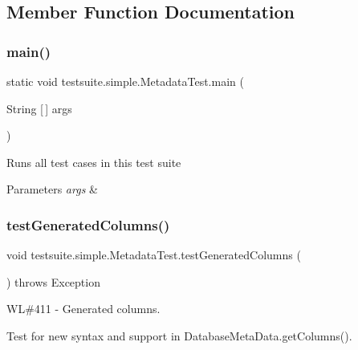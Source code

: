 \subsection{Member Function Documentation}
\mbox{\label{classtestsuite_1_1simple_1_1_metadata_test_a8a06af1a7d28478dbe8d0b9ec2146908}} 
\subsubsection{\texorpdfstring{main()}{main()}}
{\footnotesize\ttfamily static void testsuite.\+simple.\+Metadata\+Test.\+main (\begin{DoxyParamCaption}\item[{String \mbox{[}$\,$\mbox{]}}]{args }\end{DoxyParamCaption})\hspace{0.3cm}{\ttfamily [static]}}

Runs all test cases in this test suite


\begin{DoxyParams}{Parameters}
{\em args} & \\
\hline
\end{DoxyParams}
\mbox{\label{classtestsuite_1_1simple_1_1_metadata_test_a27296d9b08d2b4d91aa016482c2cef68}} 
\subsubsection{\texorpdfstring{test\+Generated\+Columns()}{testGeneratedColumns()}}
{\footnotesize\ttfamily void testsuite.\+simple.\+Metadata\+Test.\+test\+Generated\+Columns (\begin{DoxyParamCaption}{ }\end{DoxyParamCaption}) throws Exception}

WL\#411 -\/ Generated columns.

Test for new syntax and support in Database\+Meta\+Data.\+get\+Columns().

